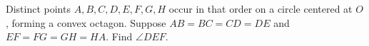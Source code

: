 Distinct points $A,B,C,D,E,F,G,H$ occur in that order on a circle centered at $O$, forming a convex octagon. Suppose $AB=BC=CD=DE$ and $EF=FG=GH=HA$. Find $\angle DEF$.
